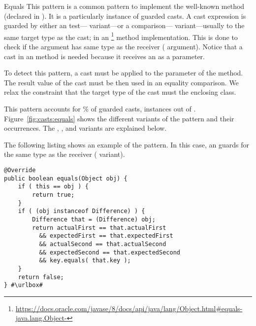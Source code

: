 \begin{pattern}{Equals}
This pattern is a common pattern to implement the well-known  method (declared in ).
It is a particularly instance of guarded casts.
A cast expression is guarded by either an
 test--- variant---or a
 comparison--- variant---usually to the same target type as the cast;
in an %
\footnote{\url{https://docs.oracle.com/javase/8/docs/api/java/lang/Object.html\#equals-java.lang.Object-}}
method implementation.
This is done to check if the argument has same type as the receiver
( argument).
Notice that a cast in an  method is needed because it
receives an  as a parameter.

To detect this pattern,
a cast must be applied to the parameter of the  method.
The result value of the cast must be then used in an equality comparison.
We relax the constraint that the target type of the cast must the enclosing class.

\instances{}
This pattern accounts for \nEqualsOutOfGuarded\% of guarded casts,
\nEqualsPattern{} instances out of \nGuarded{}.
Figure~\ref{fig:casts:equals} shows the different variants of the \thisp{} pattern and their occurrences.
The , , and
 variants are explained below.


The following listing shows an example of the \thisp{} pattern.
In this case,
an  guards for the same type as the receiver 
( variant).

\def\urlvar{http://bit.ly/neo4j_neo4j_2vJw94J}
\begin{verbatim}
@Override
public boolean equals(Object obj) {
    if ( this == obj ) {
        return true;
    }
    if ( (obj instanceof Difference) ) {
        Difference that = (Difference) obj;
        return actualFirst == that.actualFirst
          && expectedFirst == that.expectedFirst
          && actualSecond == that.actualSecond 
          && expectedSecond == that.expectedSecond
          && key.equals( that.key );
    }
    return false;
} #\urlbox#
\end{verbatim}


\end{pattern}
